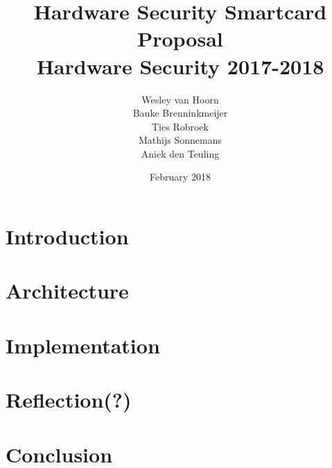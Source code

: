 \documentclass{article}
\title{Hardware Security Smartcard Proposal \\ Hardware Security 2017-2018}
\author{Wesley van Hoorn \\ Bauke Brenninkmeijer \\ Ties Robroek \\
Mathijs Sonnemans \\ Aniek den Teuling}
\date{February 2018}
\begin{document}
\maketitle

\section{Introduction}

\section{Architecture}





\section{Implementation}




\section{Reflection(?)}



\section{Conclusion}
\end{document}

